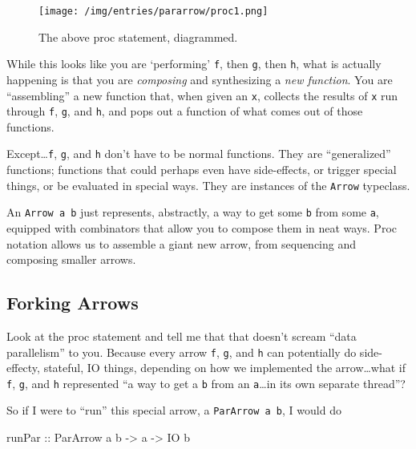 \documentclass[]{article}
\newenvironment{Shaded}{}{}
\newcommand{\DataTypeTok}[1]{\textcolor[rgb]{0.56,0.13,0.00}{#1}}
\newcommand{\NormalTok}[1]{#1}
\newcommand{\OtherTok}[1]{\textcolor[rgb]{0.00,0.44,0.13}{#1}}
\begin{document}
\begin{figure}
\centering
\texttt{[image: /img/entries/pararrow/proc1.png]}
\caption{The above proc statement, diagrammed.}
\end{figure}

While this looks like you are `performing' \texttt{f}, then \texttt{g}, then
\texttt{h}, what is actually happening is that you are \emph{composing} and
synthesizing a \emph{new function}. You are ``assembling'' a new function that,
when given an \texttt{x}, collects the results of \texttt{x} run through
\texttt{f}, \texttt{g}, and \texttt{h}, and pops out a function of what comes
out of those functions.

Except\ldots{}\texttt{f}, \texttt{g}, and \texttt{h} don't have to be normal
functions. They are ``generalized'' functions; functions that could perhaps even
have side-effects, or trigger special things, or be evaluated in special ways.
They are instances of the \texttt{Arrow} typeclass.

An \texttt{Arrow\ a\ b} just represents, abstractly, a way to get some
\texttt{b} from some \texttt{a}, equipped with combinators that allow you to
compose them in neat ways. Proc notation allows us to assemble a giant new
arrow, from sequencing and composing smaller arrows.

\hypertarget{forking-arrows}{%
\subsection{Forking Arrows}\label{forking-arrows}}

Look at the proc statement and tell me that that doesn't scream ``data
parallelism'' to you. Because every arrow \texttt{f}, \texttt{g}, and \texttt{h}
can potentially do side-effecty, stateful, IO things, depending on how we
implemented the arrow\ldots{}what if \texttt{f}, \texttt{g}, and \texttt{h}
represented ``a way to get a \texttt{b} from an \texttt{a}\ldots{}in its own
separate thread''?

So if I were to ``run'' this special arrow, a \texttt{ParArrow\ a\ b}, I would
do

\begin{Shaded}
\begin{Highlighting}[]
\OtherTok{runPar ::} \DataTypeTok{ParArrow}\NormalTok{ a b }\OtherTok{->}\NormalTok{ a }\OtherTok{->} \DataTypeTok{IO}\NormalTok{ b}
\end{Highlighting}
\end{Shaded}
\end{document}
